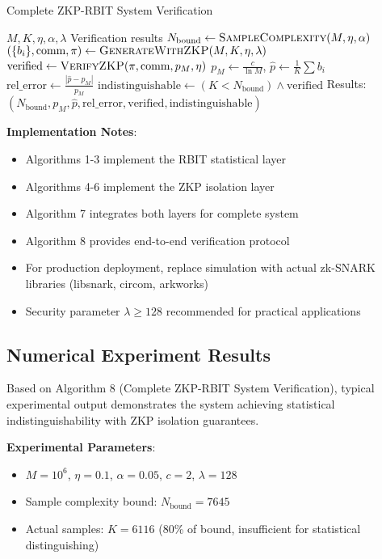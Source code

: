 \documentclass[12pt]{article}
\theoremstyle{plain}
\theoremstyle{definition}
\begin{document}
\begin{algorithm}
\caption{Complete ZKP-RBIT System Verification}
\begin{algorithmic}[1]
\REQUIRE $M, K, \eta, \alpha, \lambda$
\ENSURE Verification results
\STATE $N_{\text{bound}} \leftarrow \textsc{SampleComplexity}(M, \eta, \alpha)$
\STATE $(\{b_i\}, \text{comm}, \pi) \leftarrow \textsc{GenerateWithZKP}(M, K, \eta, \lambda)$
\STATE $\text{verified} \leftarrow \textsc{VerifyZKP}(\pi, \text{comm}, p_M, \eta)$
\STATE $p_M \leftarrow \frac{c}{\ln M}$, $\hat{p} \leftarrow \frac{1}{K}\sum b_i$
\STATE $\text{rel\_error} \leftarrow \frac{|\hat{p} - p_M|}{p_M}$
\STATE $\text{indistinguishable} \leftarrow (K < N_{\text{bound}}) \land \text{verified}$
\RETURN Results: $(N_{\text{bound}}, p_M, \hat{p}, \text{rel\_error}, \text{verified}, \text{indistinguishable})$
\end{algorithmic}
\end{algorithm}

\textbf{Implementation Notes}:
\begin{itemize}
\item Algorithms 1-3 implement the RBIT statistical layer
\item Algorithms 4-6 implement the ZKP isolation layer  
\item Algorithm 7 integrates both layers for complete system
\item Algorithm 8 provides end-to-end verification protocol
\item For production deployment, replace simulation with actual zk-SNARK libraries (libsnark, circom, arkworks)
\item Security parameter $\lambda \ge 128$ recommended for practical applications
\end{itemize}

\subsection{Numerical Experiment Results}

Based on Algorithm 8 (Complete ZKP-RBIT System Verification), typical experimental output demonstrates the system achieving statistical indistinguishability with ZKP isolation guarantees.

\textbf{Experimental Parameters}:
\begin{itemize}
\item $M = 10^6$, $\eta = 0.1$, $\alpha = 0.05$, $c = 2$, $\lambda = 128$
\item Sample complexity bound: $N_{\text{bound}} = 7645$
\item Actual samples: $K = 6116$ (80\% of bound, insufficient for statistical distinguishing)
\end{itemize}
\end{document}
